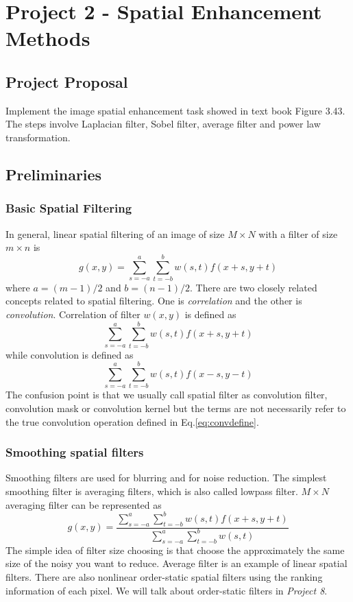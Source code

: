 \section{Project 2 - Spatial Enhancement Methods}
\subsection{Project Proposal}
Implement the image spatial enhancement task showed in text book Figure 3.43. The steps involve Laplacian
filter, Sobel filter, average filter and power law transformation.

\subsection{Preliminaries}
\subsubsection{Basic Spatial Filtering}
In general, linear spatial filtering of an image of size $M\times N$ with a filter of size $m \times n$ is \begin{equation} g(x,y)=\sum_{s=-a}^a \sum_{t=-b}^b  w(s,t)f(x+s,y+t) \end{equation} where $a=(m-1)/2$ and $b=(n-1)/2$. There are two closely related concepts related to spatial filtering.
One is \emph{correlation} and the other is \emph{convolution}. Correlation of filter $w(x, y)$ is defined as \begin{equation}\sum_{s=-a}^a \sum_{t=-b}^b  w(s,t)f(x+s,y+t) \end{equation} while convolution is defined as \begin{equation} \sum_{s=-a}^a \sum_{t=-b}^b  w(s,t)f(x-s,y-t) \label{eq:convdefine}\end{equation}
 The confusion point is that we usually call spatial filter as convolution filter, convolution mask or convolution kernel but the terms are not necessarily refer to the true convolution operation defined in Eq.\ref{eq:convdefine}. 

\subsubsection*{Smoothing spatial filters}
Smoothing filters are used for blurring and for noise reduction. The simplest smoothing filter is averaging filters, which is also called lowpass filter. $M \times N$ averaging filter can be represented as \begin{equation} g(x,y)=\frac{\sum_{s=-a}^a \sum_{t=-b}^b w(s,t)f(x+s,y+t)}{\sum_{s=-a}^a \sum_{t=-b}^b w(s,t)} \end{equation} The simple idea of filter size choosing is that choose the approximately the same size of the noisy you want to reduce. Average filter is an example of linear spatial filters. There are also nonlinear order-static spatial filters using the ranking information of each pixel. We will talk about order-static filters in \emph{Project 8}. 

